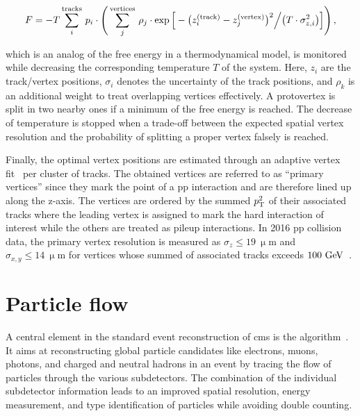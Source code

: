 \begin{equation}
F=-T\sum_{i}^\mathrm{tracks}\,p_{i}\cdot\Bigg(\sum_{j}^\mathrm{vertices}\,\rho_{j}\cdot\exp\Big[-\big(z_{i}^\scriptn{\mathrm{(track)}}-z_{j}^\scriptn{\mathrm{(vertex)}}\big)^2\Big/\big(T\cdot\sigma_{z,i}^2\big)\Big]\Bigg)\,,
\end{equation}
 
which is an analog of the free energy in a thermodynamical model, is monitored while decreasing the corresponding temperature $T$ of the system. Here, $z_{i}$ are the track/vertex positions, $\sigma_{i}$ denotes the uncertainty of the track positions, and $\rho_{k}$ is an additional weight to treat overlapping vertices effectively. A protovertex is split in two nearby ones if a minimum of the free energy is reached. The decrease of temperature is stopped when a trade-off between the expected spatial vertex resolution and the probability of splitting a proper vertex falsely is reached.

Finally, the optimal vertex positions are estimated through an adaptive vertex fit~\cite{0954-3899-34-12-N01} per cluster of tracks. The obtained vertices are referred to as ``primary vertices'' since they mark the point of a \gls{pp} interaction and are therefore lined up along the z-axis. The vertices are ordered by the summed $p_\textrm{T}^2$ of their associated tracks where the leading vertex is assigned to mark the hard interaction of interest while the others are treated as pileup interactions. In 2016 \gls{pp} collision data, the primary vertex resolution is measured as $\sigma_{z}\leq19~\upmu\mathrm{m}$ and $\sigma_{x,y}\leq14~\upmu\mathrm{m}$ for vertices whose summed \pt of associated tracks exceeds $100~\textrm{GeV}$~\cite{CMS-DP-2016-041}.



\section{Particle flow}

A central element in the standard event reconstruction of \gls{cms} is the  algorithm~\cite{Sirunyan:2017ulk,CMS:2009nxa}. It aims at reconstructing global particle candidates like electrons, muons, photons, and charged and neutral hadrons in an event by tracing the flow of particles through the various subdetectors. The combination of the individual subdetector information leads to an improved spatial resolution, energy measurement, and type identification of particles while avoiding double counting.


